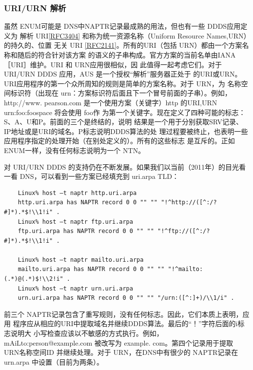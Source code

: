 \subsubsection{ URI/URN 解析}

虽然 ENUM可能是 DNS中NAPTR记录最成熟的用法，但也有一些 DDDS应用定义为
解析 URI\href{https://www.rfc-editor.org/rfc/rfc3404}{[RFC3404]} 和称为统一资源名称（Uniform Resource Names,URN）的持久的、位置
无关 URI \href{https://www.rfc-editor.org/rfc/rfc2141}{[RFC2141]}。所有的URI（包括 URN）都由一个方案名称和随后的符合针对该方案
的语义的子串构成。官方方案的当前名单由IANA［URI］维护。URI 和 URN应用很相似，因
此值得一起考虑它们。对于 URI/URN DDDS 应用，AUS 是一个授权“解析”服务器正处于
的URI或URN。URI应用程序的第一个众所周知的规则是简单的方案名称。对于 URN，为
名称空间标识符（出现在 urn：方案标识符后面且下一个冒号前面的子串）。例如，http://www.
pearson.com 是一个使用方案（关键字）http 的URI,URN urn:foo:foospace 将会使用 foo作
为第一个关键字。现在定义了四种可能的标志：S、A、U和P。前面的三个是终结的，说明
结果是一个用于分别获取SRV记录、IP地址或是URI的域名。P标志说明DDDS算法的处
理过程要被终止，也表明一些应用程序指定的处理开始（在别处定义的）。所有的这些标志
是互斥的。正如 ENUM一样，没有任何标志说明为一个 NTN。

对 URI/URN DDDS 的支持仍在不断发展。如果我们以当前（2011年）的目光看一看
DNS，可以看到一些方案已经填充到 uri.arpa TLD：

\begin{verbatim}
    Linux% host –t naptr http.uri.arpa
    http.uri.arpa has NAPTR record 0 0 "" "" "!^http://([^:/?#]*).*$!\\1!i" .
    Linux% host –t naptr ftp.uri.arpa
    ftp.uri.arpa has NAPTR record 0 0 "" "" "!^ftp://([^:/?#]*).*$!\\1!i" .
    
    Linux% host –t naptr mailto.uri.arpa
    mailto.uri.arpa has NAPTR record 0 0 "" "" "!^mailto:(.*)@(.*)$!\\2!i" .
    Linux% host –t naptr urn.uri.arpa
    urn.uri.arpa has NAPTR record 0 0 "" "" "/urn:([^:]+)/\\1/i" .
\end{verbatim}

前三个 NAPTR记录包含了重写规则，没有任何标志。因此，它们本质上表明，应用
程序应从相应的URI中提取域名并继续DDDS算法。最后的“！”字符后面的i标志说明大
小写检查应该以不敏感的方式执行。例如，mAiLto:person@example.com 被改写为 example.
com。第四个记录用于提取 URN名称空间ID 并继续处理。对于 URN，在DNS中有很少的
NAPTR记录在 urn.arpa 中设置（目前为两条）。

